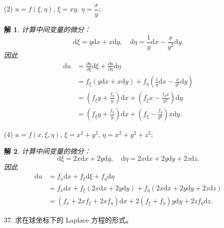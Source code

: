 \documentclass[a4paper,12pt]{article}
\newtheorem*{sol}{解}
\begin{document}
(2) $u = f(\xi,\eta),\,\xi = xy,\,\eta = \dfrac{x}{y}$;

\begin{sol}
    计算中间变量的微分：
    $$
        \mathrm{d}\xi = y\mathrm{d}x + x\mathrm{d}y, \quad \mathrm{d}\eta = \frac{1}{y}\mathrm{d}x - \frac{x}{y^2}\mathrm{d}y.
    $$
    因此
    $$
        \begin{aligned}
            \mathrm{d}u & = \frac{\partial u}{\partial\xi}\mathrm{d}\xi+\frac{\partial u}{\partial\eta}\mathrm{d}\eta                   \\
                        & = f_\xi(y\mathrm{d}x + x\mathrm{d}y) + f_\eta\left(\frac{1}{y}\mathrm{d}x - \frac{x}{y^2}\mathrm{d}y\right)   \\
                        & = \left(f_\xi y + \frac{f_\eta}{y}\right)\mathrm{d}x + \left(f_\xi x - \frac{f_\eta x}{y^2}\right)\mathrm{d}y \\
                        & = \left(f_\xi y + \frac{f_\eta}{y}\right)\mathrm{d}x + \left(f_\xi - \frac{f_\eta}{y^2}\right)x\mathrm{d}y.
        \end{aligned}
    $$
\end{sol}

(4) $u = f(x,\xi,\eta),\,\xi = x^2 + y^2,\,\eta = x^2 + y^2 + z^2$;

\begin{sol}
    计算中间变量的微分：
    $$
        \mathrm{d}\xi = 2x\mathrm{d}x + 2y\mathrm{d}y, \quad \mathrm{d}\eta = 2x\mathrm{d}x + 2y\mathrm{d}y + 2z\mathrm{d}z.
    $$
    因此
    $$
        \begin{aligned}
            \mathrm{d}u & = f_x\mathrm{d}x + f_\xi\mathrm{d}\xi + f_\eta\mathrm{d}\eta                                                    \\
                        & = f_x\mathrm{d}x + f_\xi(2x\mathrm{d}x + 2y\mathrm{d}y) + f_\eta(2x\mathrm{d}x + 2y\mathrm{d}y + 2z\mathrm{d}z) \\
                        & = (f_x + 2xf_\xi + 2xf_\eta)\mathrm{d}x + 2(f_\xi + f_\eta)y\mathrm{d}y + 2zf_\eta\mathrm{d}z.
        \end{aligned}
    $$
\end{sol}

37. 求在球坐标下的 Laplace 方程的形式。
\end{document}
